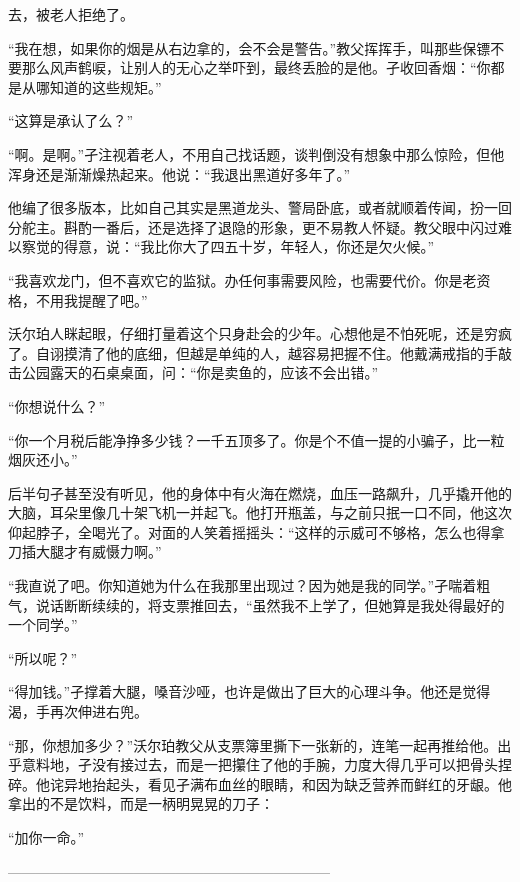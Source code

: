\documentclass{article}
\begin{document}
\newpage 

去，被老人拒绝了。

“我在想，如果你的烟是从右边拿的，会不会是警告。”教父挥挥手，叫那些保镖不要那么风声鹤唳，让别人的无心之举吓到，最终丢脸的是他。孑收回香烟：“你都是从哪知道的这些规矩。”

“这算是承认了么？”

“啊。是啊。”孑注视着老人，不用自己找话题，谈判倒没有想象中那么惊险，但他浑身还是渐渐燥热起来。他说：“我退出黑道好多年了。”

他编了很多版本，比如自己其实是黑道龙头、警局卧底，或者就顺着传闻，扮一回分舵主。斟酌一番后，还是选择了退隐的形象，更不易教人怀疑。教父眼中闪过难以察觉的得意，说：“我比你大了四五十岁，年轻人，你还是欠火候。”

“我喜欢龙门，但不喜欢它的监狱。办任何事需要风险，也需要代价。你是老资格，不用我提醒了吧。”

沃尔珀人眯起眼，仔细打量着这个只身赴会的少年。心想他是不怕死呢，还是穷疯了。自诩摸清了他的底细，但越是单纯的人，越容易把握不住。他戴满戒指的手敲击公园露天的石桌桌面，问：“你是卖鱼的，应该不会出错。”

“你想说什么？”

\newpage 



“你一个月税后能净挣多少钱？一千五顶多了。你是个不值一提的小骗子，比一粒烟灰还小。”

后半句孑甚至没有听见，他的身体中有火海在燃烧，血压一路飙升，几乎撬开他的大脑，耳朵里像几十架飞机一并起飞。他打开瓶盖，与之前只抿一口不同，他这次仰起脖子，全喝光了。对面的人笑着摇摇头：“这样的示威可不够格，怎么也得拿刀插大腿才有威慑力啊。”

“我直说了吧。你知道她为什么在我那里出现过？因为她是我的同学。”孑喘着粗气，说话断断续续的，将支票推回去，“虽然我不上学了，但她算是我处得最好的一个同学。”

“所以呢？”

“得加钱。”孑撑着大腿，嗓音沙哑，也许是做出了巨大的心理斗争。他还是觉得渴，手再次伸进右兜。

“那，你想加多少？”沃尔珀教父从支票簿里撕下一张新的，连笔一起再推给他。出乎意料地，孑没有接过去，而是一把攥住了他的手腕，力度大得几乎可以把骨头捏碎。他诧异地抬起头，看见孑满布血丝的眼睛，和因为缺乏营养而鲜红的牙龈。他拿出的不是饮料，而是一柄明晃晃的刀子：

“加你一命。”

\newpage 



———————————————————————
\end{document}
